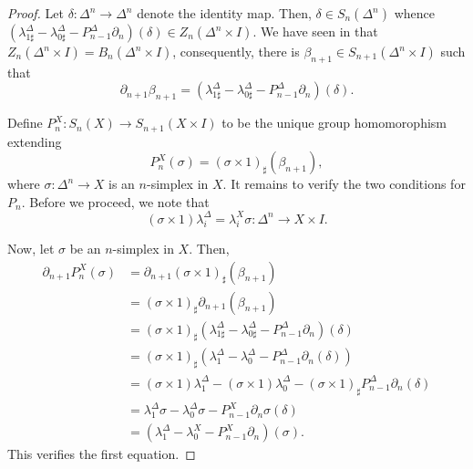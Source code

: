 \documentclass[10pt]{article}
\theoremstyle{thmstyle}
\theoremstyle{defstyle}
\begin{document}
\begin{proof}
    Let $\delta: \Delta^n\to\Delta^n$ denote the identity map. Then, $\delta\in S_n(\Delta^n)$ whence $(\lambda^\Delta_{1\sharp} - \lambda^\Delta_{0\sharp} - P^{\Delta}_{n - 1}\partial_n)(\delta)\in Z_n(\Delta^n\times I)$. We have seen in  that $Z_n(\Delta^n\times I) = B_n(\Delta^n\times I)$, consequently, there is $\beta_{n + 1}\in S_{n + 1}(\Delta^n\times I)$ such that
    \begin{equation*}
        \partial_{n + 1}\beta_{n + 1} = (\lambda^\Delta_{1\sharp} - \lambda^\Delta_{0\sharp} - P^{\Delta}_{n - 1}\partial_n)(\delta).
    \end{equation*}

    Define $P^X_n: S_n(X)\to S_{n + 1}(X\times I)$ to be the unique group homomorophism extending 
    \begin{equation*}
        P_n^X(\sigma) = (\sigma\times 1)_\sharp(\beta_{n + 1}),
    \end{equation*}
    where $\sigma: \Delta^n\to X$ is an $n$-simplex in $X$. It remains to verify the two conditions for $P_n$. Before we proceed, we note that 
    \begin{equation*}
        (\sigma\times 1)\lambda^\Delta_i = \lambda^X_i\sigma: \Delta^n\to X\times I.
    \end{equation*}

    Now, let $\sigma$ be an $n$-simplex in $X$. Then, 
    \begin{align*}
        \partial_{n + 1}P_n^X(\sigma) &= \partial_{n + 1}(\sigma\times 1)_\sharp(\beta_{n + 1})\\
        &= (\sigma\times 1)_{\sharp}\partial_{n + 1}(\beta_{n + 1})\\
        &= (\sigma\times 1)_\sharp\left(\lambda^\Delta_{1\sharp} - \lambda^\Delta_{0\sharp} - P^{\Delta}_{n - 1}\partial_n\right)(\delta)\\
        &= (\sigma\times 1)_{\sharp}\left(\lambda^\Delta_1 - \lambda^\Delta_0 - P_{n - 1}^\Delta\partial_n(\delta)\right)\\
        &= (\sigma\times 1)\lambda^\Delta_1 - (\sigma\times 1)\lambda^\Delta_0 - (\sigma\times 1)_\sharp P^\Delta_{n - 1}\partial_n(\delta)\\
        &= \lambda^\Delta_1\sigma - \lambda^\Delta_0\sigma - P^X_{n - 1}\partial_n\sigma(\delta)\\
        &= \left(\lambda_1^\Delta - \lambda^X_0 - P^X_{n - 1}\partial_n\right)(\sigma).
    \end{align*}
    This verifies the first equation.


\end{proof}
\end{document}

